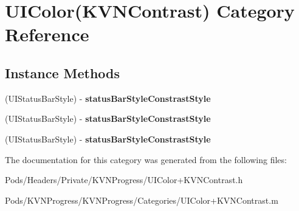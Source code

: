 \hypertarget{category_u_i_color_07_k_v_n_contrast_08}{}\section{U\+I\+Color(K\+V\+N\+Contrast) Category Reference}
\label{category_u_i_color_07_k_v_n_contrast_08}
\subsection*{Instance Methods}
\begin{DoxyCompactItemize}
\item 
\mbox{\label{category_u_i_color_07_k_v_n_contrast_08_a1e2a271f457a67e49e6a9512eff9fc56}} 
(U\+I\+Status\+Bar\+Style) -\/ {\bfseries status\+Bar\+Style\+Constrast\+Style}
\item 
\mbox{\label{category_u_i_color_07_k_v_n_contrast_08_a1e2a271f457a67e49e6a9512eff9fc56}} 
(U\+I\+Status\+Bar\+Style) -\/ {\bfseries status\+Bar\+Style\+Constrast\+Style}
\item 
\mbox{\label{category_u_i_color_07_k_v_n_contrast_08_a1e2a271f457a67e49e6a9512eff9fc56}} 
(U\+I\+Status\+Bar\+Style) -\/ {\bfseries status\+Bar\+Style\+Constrast\+Style}
\end{DoxyCompactItemize}


The documentation for this category was generated from the following files\+:\begin{DoxyCompactItemize}
\item 
Pods/\+Headers/\+Private/\+K\+V\+N\+Progress/U\+I\+Color+\+K\+V\+N\+Contrast.\+h\item 
Pods/\+K\+V\+N\+Progress/\+K\+V\+N\+Progress/\+Categories/U\+I\+Color+\+K\+V\+N\+Contrast.\+m\end{DoxyCompactItemize}
